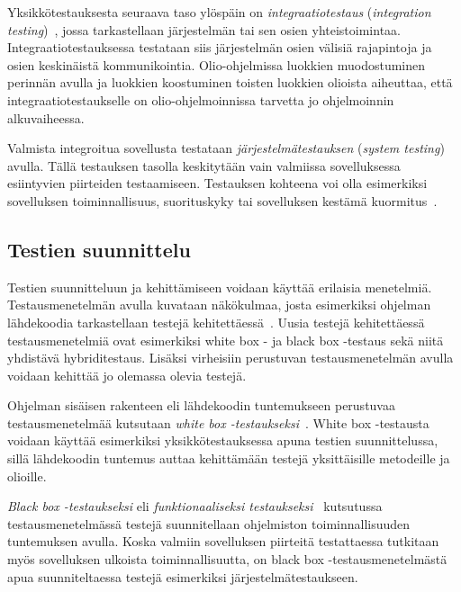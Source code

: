 \documentclass[finnish, grading]{tktltiki2}
\theoremstyle{definition}
\theoremstyle{remark}
\begin{document}
Yksikkötestauksesta seuraava taso ylöspäin on \textit{integraatiotestaus} (\textit{integration testing})~\cite[s. 45]{Binder:1999}, jossa tarkastellaan järjestelmän tai sen osien yhteistoimintaa. Integraatiotestauksessa testataan siis järjestelmän osien välisiä rajapintoja ja osien keskinäistä kommunikointia. Olio-ohjelmissa luokkien muodostuminen perinnän avulla ja luokkien koostuminen toisten luokkien olioista aiheuttaa, että integraatiotestaukselle on olio-ohjelmoinnissa tarvetta jo ohjelmoinnin alkuvaiheessa. 

Valmista integroitua sovellusta testataan \textit{järjestelmätestauksen} (\textit{system testing})~\cite[s. 45]{Binder:1999} avulla. Tällä testauksen tasolla keskitytään vain valmiissa sovelluksessa esiintyvien piirteiden testaamiseen. Testauksen kohteena voi olla esimerkiksi sovelluksen toiminnallisuus, suorituskyky tai sovelluksen kestämä kuormitus~\cite[s. 45]{Binder:1999}. 


\subsection{Testien suunnittelu}

Testien suunnitteluun ja kehittämiseen voidaan käyttää erilaisia menetelmiä. Testausmenetelmän avulla kuvataan näkökulmaa, josta esimerkiksi ohjelman lähdekoodia tarkastellaan testejä kehitettäessä~\cite[s. 51]{Binder:1999}. Uusia testejä kehitettäessä testausmenetelmiä ovat esimerkiksi white box - ja black box -testaus sekä niitä yhdistävä hybriditestaus. Lisäksi virheisiin perustuvan testausmenetelmän avulla voidaan kehittää jo olemassa olevia testejä.

Ohjelman sisäisen rakenteen eli lähdekoodin tuntemukseen perustuvaa testausmenetelmää kutsutaan \textit{white box -testaukseksi}~\cite[s. 52]{Binder:1999}. %
White box -testausta voidaan käyttää esimerkiksi yksikkötestauksessa apuna testien suunnittelussa, sillä lähdekoodin tuntemus auttaa kehittämään testejä yksittäisille metodeille ja olioille.

\textit{Black box -testaukseksi} eli \textit{funktionaaliseksi testaukseksi}~\cite[s. 52]{Binder:1999} kutsutussa testausmenetelmässä testejä suunnitellaan ohjelmiston toiminnallisuuden tuntemuksen avulla. %
Koska valmiin sovelluksen piirteitä testattaessa tutkitaan myös sovelluksen ulkoista toiminnallisuutta, on black box -testausmenetelmästä apua suunniteltaessa testejä esimerkiksi järjestelmätestaukseen.
\end{document}
